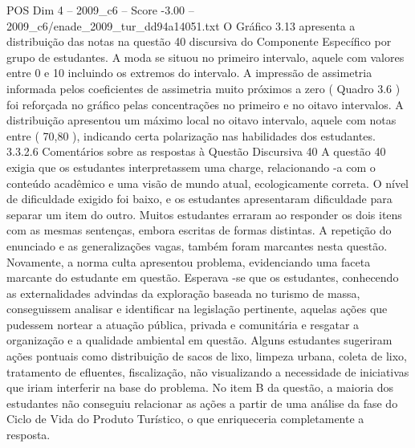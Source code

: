 \begin{textsample}{POS Dim 4 – 2009\_c6 – Score -3.00 – 2009\_c6/enade\_2009\_tur\_dd94a14051.txt}
O Gráfico 3.13 apresenta a distribuição das notas na questão 40 discursiva do Componente Específico por grupo de estudantes.
A moda se situou no primeiro intervalo, aquele com valores entre 0 e 10 incluindo os extremos do intervalo.
A impressão de assimetria informada pelos coeficientes de assimetria muito próximos a zero ( Quadro 3.6 ) foi reforçada no gráfico pelas concentrações no primeiro e no oitavo intervalos.
A distribuição apresentou um máximo local no oitavo intervalo, aquele com notas entre ( 70,80 ), indicando certa polarização nas habilidades dos estudantes. 3.3.2.6 Comentários sobre as respostas à Questão Discursiva 40 A questão 40 exigia que os estudantes interpretassem uma charge, relacionando -a com o conteúdo acadêmico e uma visão de mundo atual, ecologicamente correta.
O nível de dificuldade exigido foi baixo, e os estudantes apresentaram dificuldade para separar um item do outro.
Muitos estudantes erraram ao responder os dois itens com as mesmas sentenças, embora escritas de formas distintas.
A repetição do enunciado e as generalizações vagas, também foram marcantes nesta questão.
Novamente, a norma culta apresentou problema, evidenciando uma faceta marcante do estudante em questão.
Esperava -se que os estudantes, conhecendo as externalidades advindas da exploração baseada no turismo de massa, conseguissem analisar e identificar na legislação pertinente, aquelas ações que pudessem nortear a atuação pública, privada e comunitária e resgatar a organização e a qualidade ambiental em questão.
Alguns estudantes sugeriram ações pontuais como distribuição de sacos de lixo, limpeza urbana, coleta de lixo, tratamento de efluentes, fiscalização, não visualizando a necessidade de iniciativas que iriam interferir na base do problema.
No item B da questão, a maioria dos estudantes não conseguiu relacionar as ações a partir de uma análise da fase do Ciclo de Vida do Produto Turístico, o que enriqueceria completamente a resposta.

\end{textsample}
